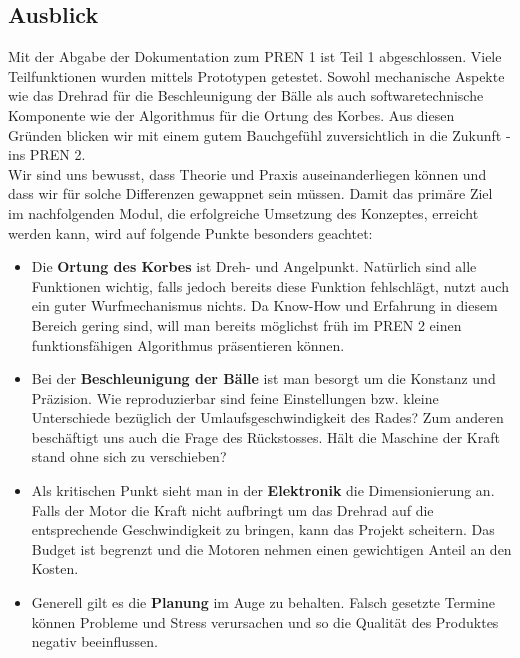 \subsection{Ausblick}
Mit der Abgabe der Dokumentation zum PREN 1 ist Teil 1 abgeschlossen. Viele Teilfunktionen wurden mittels Prototypen getestet. Sowohl mechanische Aspekte wie das Drehrad für die Beschleunigung der Bälle als auch softwaretechnische Komponente wie der Algorithmus für die Ortung des Korbes. Aus diesen Gründen blicken wir mit einem gutem Bauchgefühl zuversichtlich in die Zukunft - ins PREN 2. \\
Wir sind uns bewusst, dass Theorie und Praxis auseinanderliegen können und dass wir für solche Differenzen gewappnet sein müssen. Damit das primäre Ziel im nachfolgenden Modul, die erfolgreiche Umsetzung des Konzeptes, erreicht werden kann, wird auf folgende Punkte besonders geachtet:

\begin{itemize}
	\item Die \textbf{Ortung des Korbes} ist Dreh- und Angelpunkt. Natürlich sind alle Funktionen wichtig, falls jedoch bereits diese Funktion fehlschlägt, nutzt auch ein guter Wurfmechanismus nichts. Da Know-How und Erfahrung in diesem Bereich gering sind, will man bereits möglichst früh im PREN 2 einen funktionsfähigen Algorithmus präsentieren können.
	
	\item Bei der \textbf{Beschleunigung der Bälle} ist man besorgt um die Konstanz und Präzision. Wie reproduzierbar sind feine Einstellungen bzw. kleine Unterschiede bezüglich der Umlaufsgeschwindigkeit des Rades? Zum anderen beschäftigt uns auch die Frage des Rückstosses. Hält die Maschine der Kraft stand ohne sich zu verschieben?
	
	\item Als kritischen Punkt sieht man in der \textbf{Elektronik} die Dimensionierung an. Falls der Motor die Kraft nicht aufbringt um das Drehrad auf die entsprechende Geschwindigkeit zu bringen, kann das Projekt scheitern. Das Budget ist begrenzt und die Motoren nehmen einen gewichtigen Anteil an den Kosten.
	
	\item Generell gilt es die \textbf{Planung} im Auge zu behalten. Falsch gesetzte Termine können Probleme und Stress verursachen und so die Qualität des Produktes negativ beeinflussen.
	
\end{itemize}